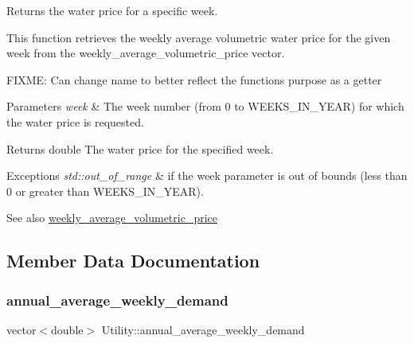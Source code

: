 Returns the water price for a specific week. 

This function retrieves the weekly average volumetric water price for the given week from the weekly\+\_\+average\+\_\+volumetric\+\_\+price vector.

F\+I\+X\+ME\+: Can change name to better reflect the function\textquotesingle{}s purpose as a getter


\begin{DoxyParams}{Parameters}
{\em week} & The week number (from 0 to W\+E\+E\+K\+S\+\_\+\+I\+N\+\_\+\+Y\+E\+AR) for which the water price is requested.\\
\hline
\end{DoxyParams}
\begin{DoxyReturn}{Returns}
double The water price for the specified week.
\end{DoxyReturn}

\begin{DoxyExceptions}{Exceptions}
{\em std\+::out\+\_\+of\+\_\+range} & if the week parameter is out of bounds (less than 0 or greater than W\+E\+E\+K\+S\+\_\+\+I\+N\+\_\+\+Y\+E\+AR).\\
\hline
\end{DoxyExceptions}
\begin{DoxySeeAlso}{See also}
\mbox{\hyperlink{classUtility_acb779ceddbc1820c8bec7b2f87886d7c}{weekly\+\_\+average\+\_\+volumetric\+\_\+price}} 
\end{DoxySeeAlso}


\subsection{Member Data Documentation}
\mbox{\label{classUtility_a7a8e49d34c5bb984d19c475abb6b04d0}} 
\subsubsection{\texorpdfstring{annual\+\_\+average\+\_\+weekly\+\_\+demand}{annual\_average\_weekly\_demand}}
{\footnotesize\ttfamily vector$<$double$>$ Utility\+::annual\+\_\+average\+\_\+weekly\+\_\+demand\hspace{0.3cm}{\ttfamily [private]}}



